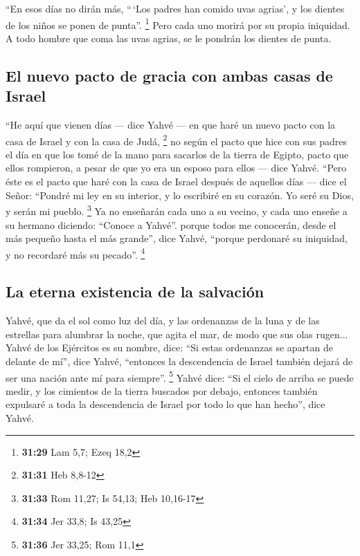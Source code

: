  ``En esos días no dirán más, ``\,`Los padres han comido
uvas agrias', y los dientes de los niños se ponen de punta''.
\footnote{\textbf{31:29} Lam 5,7; Ezeq 18,2}  Pero cada
uno morirá por su propia iniquidad. A todo hombre que coma las uvas
agrias, se le pondrán los dientes de punta.

\hypertarget{el-nuevo-pacto-de-gracia-con-ambas-casas-de-israel}{%
\subsection{El nuevo pacto de gracia con ambas casas de
Israel}\label{el-nuevo-pacto-de-gracia-con-ambas-casas-de-israel}}

 ``He aquí que vienen días --- dice Yahvé --- en que haré
un nuevo pacto con la casa de Israel y con la casa de Judá, \footnote{\textbf{31:31}
  Heb 8,8-12}  no según el pacto que hice con sus padres
el día en que los tomé de la mano para sacarlos de la tierra de Egipto,
pacto que ellos rompieron, a pesar de que yo era un esposo para ellos
--- dice Yahvé.  ``Pero éste es el pacto que haré con la
casa de Israel después de aquellos días --- dice el Señor: ``Pondré mi
ley en su interior, y lo escribiré en su corazón. Yo seré su Dios, y
serán mi pueblo. \footnote{\textbf{31:33} Rom 11,27; Is 54,13; Heb
  10,16-17}  Ya no enseñarán cada uno a su vecino, y cada
uno enseñe a su hermano diciendo: ``Conoce a Yahvé''. porque todos me
conocerán, desde el más pequeño hasta el más grande'', dice Yahvé,
``porque perdonaré su iniquidad, y no recordaré más su pecado''.
\footnote{\textbf{31:34} Jer 33,8; Is 43,25}

\hypertarget{la-eterna-existencia-de-la-salvaciuxf3n}{%
\subsection{La eterna existencia de la
salvación}\label{la-eterna-existencia-de-la-salvaciuxf3n}}

 Yahvé, que da el sol como luz del día, y las ordenanzas
de la luna y de las estrellas para alumbrar la noche, que agita el mar,
de modo que sus olas rugen... Yahvé de los Ejércitos es su nombre, dice:
 ``Si estas ordenanzas se apartan de delante de mí'',
dice Yahvé, ``entonces la descendencia de Israel también dejará de ser
una nación ante mí para siempre''. \footnote{\textbf{31:36} Jer 33,25;
  Rom 11,1}  Yahvé dice: ``Si el cielo de arriba se puede
medir, y los cimientos de la tierra buscados por debajo, entonces
también expulsaré a toda la descendencia de Israel por todo lo que han
hecho'', dice Yahvé.

